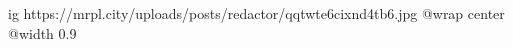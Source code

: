  
 
 
 
 

\ifcmt
  ig https://mrpl.city/uploads/posts/redactor/qqtwte6cixnd4tb6.jpg
  @wrap center
  @width 0.9
\fi
